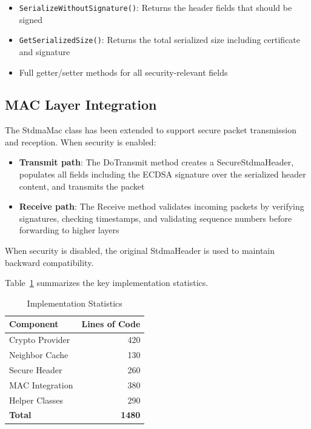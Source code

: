 \documentclass[conference]{IEEEtran}
\begin{document}
\begin{itemize}
    \item \texttt{SerializeWithoutSignature()}: Returns the header fields that should be signed
    \item \texttt{GetSerializedSize()}: Returns the total serialized size including certificate and signature
    \item Full getter/setter methods for all security-relevant fields
\end{itemize}

\subsection{MAC Layer Integration}

The StdmaMac class has been extended to support secure packet transmission and reception. When security is enabled:
\begin{itemize}
    \item \textbf{Transmit path}: The DoTransmit method creates a SecureStdmaHeader, populates all fields including the ECDSA signature over the serialized header content, and transmits the packet
    \item \textbf{Receive path}: The Receive method validates incoming packets by verifying signatures, checking timestamps, and validating sequence numbers before forwarding to higher layers
\end{itemize}

When security is disabled, the original StdmaHeader is used to maintain backward compatibility.

Table~\ref{tab:implementation} summarizes the key implementation statistics.

\begin{table}[htbp]
\caption{Implementation Statistics}
\begin{center}
\begin{tabular}{lr}
\toprule
Component & Lines of Code \\
\midrule
Crypto Provider & 420 \\
Neighbor Cache & 130 \\
Secure Header & 260 \\
MAC Integration & 380 \\
Helper Classes & 290 \\
\midrule
\textbf{Total} & \textbf{1480} \\
\bottomrule
\end{tabular}
\end{center}
\label{tab:implementation}
\end{table}
\end{document}
